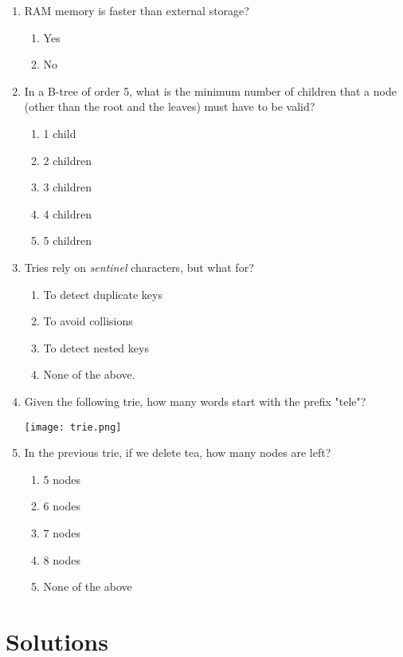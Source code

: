 \documentclass[11pt]{article}
\begin{document}
\begin{enumerate}
\item RAM memory is faster than external storage?
\begin{enumerate}
\item Yes
\item No
\end{enumerate}

\item In a B-tree of order 5, what is the minimum number of children
that a node (other than the root and the leaves) must have to be
valid?
\begin{enumerate}
\item 1 child
\item 2 children
\item 3 children
\item 4 children
\item 5 children
\end{enumerate}

\item Tries rely on \emph{sentinel} characters, but what for?
\begin{enumerate}
\item To detect duplicate keys
\item To avoid collisions
\item To detect nested keys
\item None of the above.
\end{enumerate}

\item Given the following trie, how many words start with the prefix
"tele"?

\begin{center}
\texttt{[image: trie.png]}
\end{center}

\item In the previous trie, if we delete tea, how many nodes are left?
\begin{enumerate}
\item 5 nodes
\item 6 nodes
\item 7 nodes
\item 8 nodes
\item None of the above
\end{enumerate}
\end{enumerate}


\section{Solutions}
\label{sec:org75cc52d}
\end{document}

